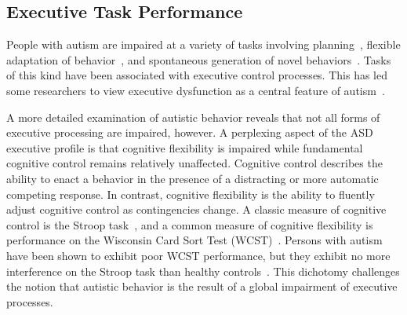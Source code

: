 %
%

\subsection{Executive Task Performance}

People with autism are impaired at a variety of tasks involving planning~\cite{BennettoL:1996:AutismPlanningWCST}, flexible adaptation of behavior~\cite{BennettoL:1996:AutismPlanningWCST,Ozonoff:1999:AutismStroopWCST}, and spontaneous generation of novel behaviors~\cite{TurnerW:1999:AutismGenerativity}. Tasks of this kind have been associated with executive control processes. This has led some researchers to view executive dysfunction as a central feature of autism~\cite{HughesC:1994:AutismExecutiveDysfunction}.


A more detailed examination of autistic behavior reveals that not all forms of executive processing are impaired, however. A perplexing aspect of the ASD executive profile is that cognitive flexibility is impaired while fundamental cognitive control remains relatively unaffected. Cognitive control describes the ability to enact a behavior in the presence of a distracting or more automatic competing response. In contrast, cognitive flexibility is the ability to fluently adjust cognitive control as contingencies change. A classic measure of cognitive control is the Stroop task~\cite{StroopJR:1935:Interference}, and a common measure of cognitive flexibility is performance on the Wisconsin Card Sort Test (WCST)~\cite{BergEA:1948:WCST}. Persons with autism have been shown to exhibit poor WCST performance, but they exhibit no more interference on the Stroop task than healthy controls~\cite{Ozonoff:1999:AutismStroopWCST}. This dichotomy challenges the notion that autistic behavior is the result of a global impairment of executive processes.

